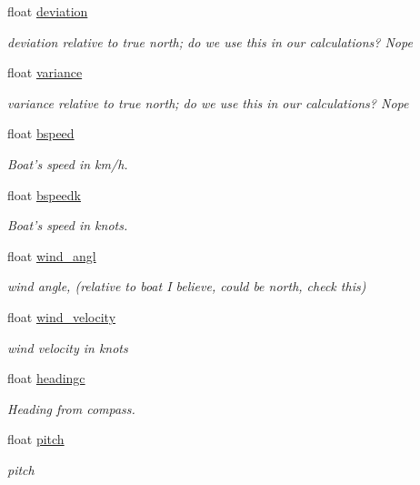 \begin{DoxyCompactItemize}
float \hyperlink{group__group1_gad20d9e23979c81b96a060830d0d460a6}{deviation}
\begin{DoxyCompactList}\small\item\em deviation relative to true north; do we use this in our calculations? \-Nope \end{DoxyCompactList}\item 
float \hyperlink{group__group1_gaec967762d2c44e3594070dca470ae334}{variance}
\begin{DoxyCompactList}\small\item\em variance relative to true north; do we use this in our calculations? \-Nope \end{DoxyCompactList}\item 
float \hyperlink{group__group1_ga3c5844d05a57a968ed5686a10e4a5af8}{bspeed}
\begin{DoxyCompactList}\small\item\em \-Boat's speed in km/h. \end{DoxyCompactList}\item 
float \hyperlink{group__group1_ga6ebc5b99dfacc747433709383f3bea8c}{bspeedk}
\begin{DoxyCompactList}\small\item\em \-Boat's speed in knots. \end{DoxyCompactList}\item 
float \hyperlink{group__group1_ga6bc5259b7cc1cb6128495b28f55b0a5d}{wind\-\_\-angl}
\begin{DoxyCompactList}\small\item\em wind angle, (relative to boat \-I believe, could be north, check this) \end{DoxyCompactList}\item 
float \hyperlink{group__group1_ga641fd5e4834deb5465b1931b7645457d}{wind\-\_\-velocity}
\begin{DoxyCompactList}\small\item\em wind velocity in knots \end{DoxyCompactList}\item 
float \hyperlink{group__group1_ga4736792191ccbbbb7b3d6933a3302336}{headingc}
\begin{DoxyCompactList}\small\item\em \-Heading from compass. \end{DoxyCompactList}\item 
float \hyperlink{group__group1_ga282e7d4378d4a18a805b8980295ac86c}{pitch}
\begin{DoxyCompactList}\small\item\em pitch \end{DoxyCompactList}\item 

\end{DoxyCompactItemize}
